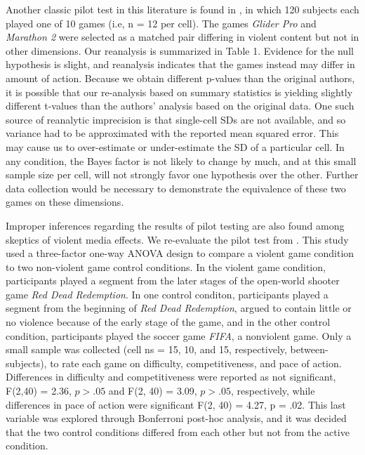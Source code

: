 \documentclass[fignum,nobf,man]{apa}
\begin{document}
Another classic pilot test in this literature is found in \citet[study 1]{Anderson:etal:2004}, in which 120 subjects each played one of 10 games (i.e, n = 12 per cell). The games {\em Glider Pro} and {\em Marathon 2} were selected as a matched pair differing in violent content but not in other dimensions. Our reanalysis is summarized in Table 1. Evidence for the null hypothesis is slight, and reanalysis indicates that the games instead may differ in amount of action. Because we obtain different p-values than the original authors, it is possible that our re-analysis based on summary statistics is yielding slightly different t-values than the authors' analysis based on the original data. One such source of reanalytic imprecision is that single-cell SDs are not available, and so variance had to be approximated with the reported mean squared error. This may cause us to over-estimate or under-estimate the SD of a particular cell. In any condition, the Bayes factor is not likely to change by much, and at this small sample size per cell, will not strongly favor one hypothesis over the other. Further data collection would be necessary to demonstrate the equivalence of these two games on these dimensions. %

Improper inferences regarding the results of pilot testing are also found among skeptics of violent media effects. We re-evaluate the pilot test from \citet{Valadez:Ferguson:2012}. This study used a three-factor one-way ANOVA design to compare a violent game condition to two non-violent game control conditions. In the violent game condition, participants played a segment from the later stages of the open-world shooter game {\em Red Dead Redemption}. In one control conditon, participants played a segment from the beginning of {\em Red Dead Redemption}, argued to contain little or no violence because of the early stage of the game, and in the other control condition, participants played the soccer game {\em FIFA}, a nonviolent game. Only a small sample was collected (cell ns = 15, 10, and 15, respectively, between-subjects), to rate each game on difficulty, competitiveness, and pace of action. Differences in difficulty and competitiveness were reported as not significant, F(2,40) = 2.36, $p > .05$ and F(2, 40) = 3.09, $p > .05$, respectively, while differences in pace of action were significant F(2, 40) = 4.27, p = .02. This last variable was explored through Bonferroni post-hoc analysis, and it was decided that the two control conditions differed from each other but not from the active condition. %
\end{document}
